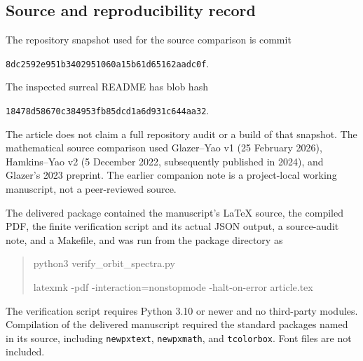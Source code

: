\documentclass[11pt,letterpaper]{article}
\theoremstyle{definition}
\theoremstyle{remark}
\begin{document}
\subsection{Source and reproducibility record}
\label{hset:ns:sub:record}
The repository snapshot used for the source comparison is commit
\begin{center}
\texttt{8dc2592e951b3402951060a15b61d65162aadc0f}.
\end{center}
The inspected surreal README has blob hash
\begin{center}
\texttt{18478d58670c384953fb85dcd1a6d931c644aa32}.
\end{center}
The article does not claim a full repository audit or a build of that snapshot. The mathematical source comparison used Glazer--Yao v1 (25 February 2026), Hamkins--Yao v2 (5 December 2022, subsequently published in 2024), and Glazer's 2023 preprint. The earlier companion note is a project-local working manuscript, not a peer-reviewed source.

The delivered package contained the manuscript's \LaTeX{} source, the compiled PDF, the finite verification script and its actual JSON output, a source-audit note, and a Makefile, and was run from the package directory as
\begin{quote}\ttfamily
python3 verify\_orbit\_spectra.py\par
latexmk -pdf -interaction=nonstopmode -halt-on-error article.tex
\end{quote}
The verification script requires Python 3.10 or newer and no third-party modules. Compilation of the delivered manuscript required the standard packages named in its source, including \texttt{newpxtext}, \texttt{newpxmath}, and \texttt{tcolorbox}. Font files are not included.

\end{document}

